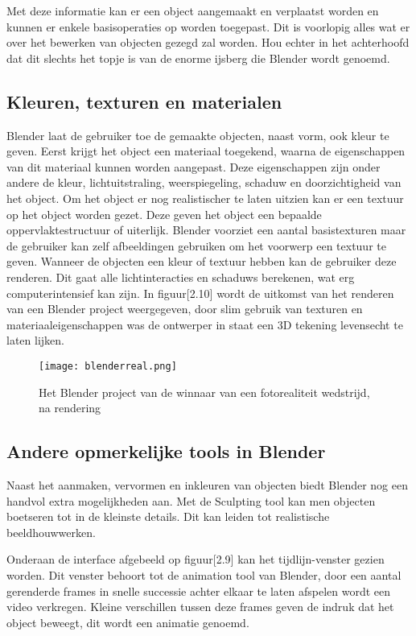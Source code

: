 \par
Met deze informatie kan er een object aangemaakt en verplaatst worden en kunnen er enkele basisoperaties op worden toegepast. Dit is voorlopig alles wat er over het bewerken van objecten gezegd zal worden. Hou echter in het achterhoofd dat dit slechts het topje is van de enorme ijsberg die Blender wordt genoemd.


\subsection{Kleuren, texturen en materialen}
Blender laat de gebruiker toe de gemaakte objecten, naast vorm, ook kleur te geven. Eerst krijgt het object een materiaal toegekend, waarna de eigenschappen van dit materiaal kunnen worden aangepast. Deze eigenschappen zijn onder andere de kleur, lichtuitstraling, weerspiegeling, schaduw en doorzichtigheid van het object. Om het object er nog realistischer te laten uitzien kan er een textuur op het object worden gezet. Deze geven het object een bepaalde oppervlaktestructuur of uiterlijk. Blender voorziet een aantal basistexturen maar de gebruiker kan zelf afbeeldingen gebruiken om het voorwerp een textuur te geven. Wanneer de objecten een kleur of textuur hebben kan de gebruiker deze renderen. Dit gaat alle lichtinteracties en schaduws berekenen, wat erg computerintensief kan zijn. In figuur[2.10] wordt de uitkomst van het renderen van een Blender project weergegeven, door slim gebruik van texturen en materiaaleigenschappen was de ontwerper in staat een 3D tekening levensecht te laten lijken. \citep*{BLEN2}

\begin{figure}[h]
\texttt{[image: blenderreal.png]}
\caption{Het Blender project van de winnaar van een fotorealiteit wedstrijd, na rendering}
\end{figure}

\subsection{Andere opmerkelijke tools in Blender}
Naast het aanmaken, vervormen en inkleuren van objecten biedt Blender nog een handvol extra mogelijkheden aan. Met de Sculpting tool kan men objecten boetseren tot in de kleinste details. Dit kan leiden tot realistische beeldhouwwerken.

\par 
Onderaan de interface afgebeeld op figuur[2.9] kan het tijdlijn-venster gezien worden. Dit venster behoort tot de animation tool van Blender, door een aantal gerenderde frames in snelle successie achter elkaar te laten afspelen wordt een video verkregen. Kleine verschillen tussen deze frames geven de indruk dat het object beweegt, dit wordt een animatie genoemd. 


